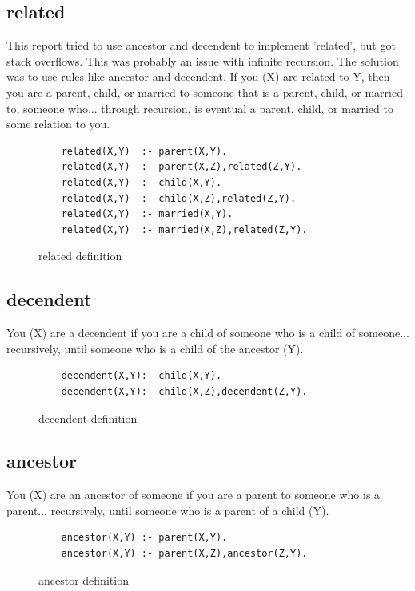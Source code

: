 \documentclass[12pt]{article}
\begin{document}
\subsection{related}
This report tried to use ancestor and decendent to implement 'related', but got stack overflows. This was
probably an issue with infinite recursion. The solution was to use rules like ancestor and decendent. If you
(X) are related to Y, then you are a parent, child, or married to someone that is a parent, child, or married to,
someone who... through recursion, is eventual a parent, child, or married to some relation to you.
\begin{figure}[!h]
 \begin{lstlisting}
	related(X,Y)  :- parent(X,Y).
	related(X,Y)  :- parent(X,Z),related(Z,Y).
	related(X,Y)  :- child(X,Y).
	related(X,Y)  :- child(X,Z),related(Z,Y).
	related(X,Y)  :- married(X,Y).
	related(X,Y)  :- married(X,Z),related(Z,Y).
 \end{lstlisting}
\caption{related definition}
\label{spec}
\end{figure}


\subsection{decendent}
You (X) are a decendent if you are a child of someone who is a child of someone... recursively, until someone who is a child of the ancestor (Y).
\begin{figure}[!h]
 \begin{lstlisting}
	decendent(X,Y):- child(X,Y).
	decendent(X,Y):- child(X,Z),decendent(Z,Y).
 \end{lstlisting}
\caption{decendent definition}
\label{spec}
\end{figure}


\subsection{ancestor}
You (X) are an ancestor of someone if you are a parent to someone who is a parent... recursively, until 
someone who is a parent of a child (Y).
\begin{figure}[!h]
 \begin{lstlisting}
	ancestor(X,Y) :- parent(X,Y).
	ancestor(X,Y) :- parent(X,Z),ancestor(Z,Y).
 \end{lstlisting}
\caption{ancestor definition}
\label{spec}
\end{figure}

 
\end{document}
